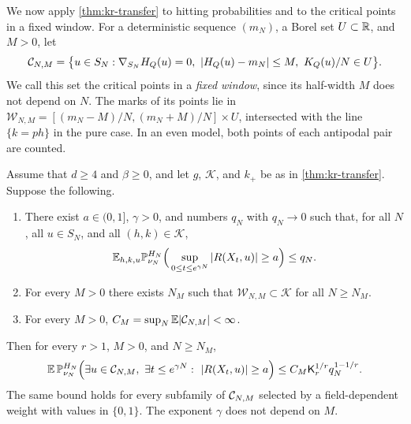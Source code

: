 We now apply \cref{thm:kr-transfer} to hitting probabilities and to the critical points in a fixed window. For a deterministic sequence $(m_N)$, a Borel set $U\subset\mathbb R$, and $M>0$, let
\begin{equation}\label{eq:kr-window}
\cC_{N,M}=\big\{u\in S_N:\nabla_{S_N}H_Q(u)=0,\ |H_Q(u)-m_N|\le M,\ K_Q(u)/N\in U\big\}.
\end{equation}
We call this set the critical points in a \emph{fixed window}, since its half-width $M$ does not depend on $N$. The marks of its points lie in $\mathcal W_{N,M}=[(m_N-M)/N,(m_N+M)/N]\times U$, intersected with the line $\{k=ph\}$ in the pure case. In an even model, both points of each antipodal pair are counted.

\begin{corollary}\label{cor:kr-window}
Assume that $d\ge4$ and $\beta\ge0$, and let $g$, $\mathcal K$, and $k_+$ be as in \cref{thm:kr-transfer}. Suppose the following.
\begin{enumerate}
\item There exist $a\in(0,1]$, $\gamma>0$, and numbers $q_N$ with $q_N\to0$ such that, for all $N$, all $u\in S_N$, and all $(h,k)\in\mathcal K$,
\[
\mathbb E_{h,k,u}\mathbb P^{H_N}_{\nu_N}\Big(\sup_{0\le t\le e^{\gamma N}}|R(X_t,u)|\ge a\Big)\le q_N.
\]
\item For every $M>0$ there exists $N_M$ such that $\mathcal W_{N,M}\subset\mathcal K$ for all $N\ge N_M$.
\item For every $M>0$, $C_M=\sup_N\mathbb E|\mathcal C_{N,M}|<\infty$.
\end{enumerate}
Then for every $r>1$, $M>0$, and $N\ge N_M$,
\begin{equation}\label{eq:kr-union-entrance}
\mathbb E\,\mathbb P^{H_N}_{\nu_N}\Big(\exists u\in\mathcal C_{N,M},\ \exists t\le e^{\gamma N}:\ |R(X_t,u)|\ge a\Big)\le C_M\mathsf K_r^{1/r}q_N^{1-1/r}.
\end{equation}
The same bound holds for every subfamily of $\mathcal C_{N,M}$ selected by a field-dependent weight with values in $\{0,1\}$. The exponent $\gamma$ does not depend on $M$.
\end{corollary}

